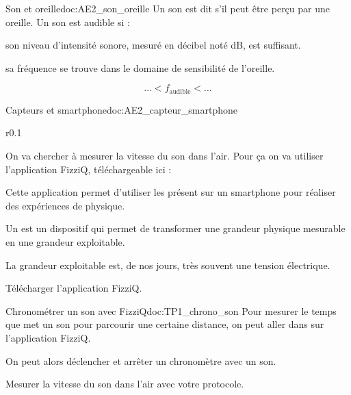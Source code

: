 \begin{doc}{Son et oreille}{doc:AE2_son_oreille}
  Un son est dit  s'il peut être perçu par une oreille.
  Un son est audible si :
  \begin{listePoints}
    \item son niveau d'intensité sonore, mesuré en décibel noté dB, est suffisant.
    \item sa fréquence se trouve dans le domaine de sensibilité de l'oreille.
  \end{listePoints}
  \begin{equation*}
      \ldots < f_\text{audible} < \ldots
  \end{equation*}
\end{doc}



\begin{doc}{Capteurs et smartphone}{doc:AE2_capteur_smartphone}
  \begin{wrapfigure}[5]{r}{0.1\linewidth}
    \vspace*{-28pt}
    \medskip
    
  \end{wrapfigure}
  On va chercher à mesurer la vitesse du son dans l'air.
  Pour ça on va utiliser l'application FizziQ, téléchargeable ici :
  
  Cette application permet d'utiliser les  présent sur un smartphone pour réaliser des expériences de physique.
  
  \begin{encart}
    Un  est un dispositif qui permet de transformer une grandeur physique mesurable en une grandeur exploitable.
  \end{encart}
  La grandeur exploitable est, de nos jours, très souvent une tension électrique.
\end{doc}


\mesure
Télécharger l'application FizziQ.

\begin{doc}{Chronométrer un son avec FizziQ}{doc:TP1_chrono_son}
  Pour mesurer le temps que met un son pour parcourir une certaine distance, on peut aller dans  sur l'application FizziQ.

  On peut alors déclencher et arrêter un chronomètre avec un son.
\end{doc}


\mesure Mesurer la vitesse du son dans l'air avec votre protocole.
